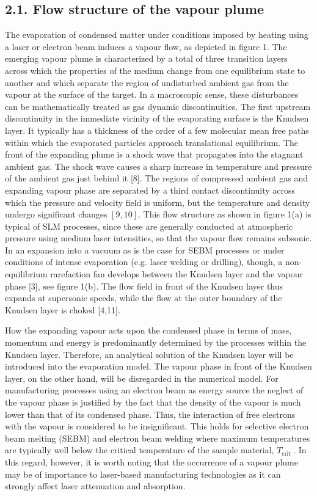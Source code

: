 \documentclass[10pt]{article}
\begin{document}
\subsection*{2.1. Flow structure of the vapour plume}
The evaporation of condensed matter under conditions imposed by heating using a laser or electron beam induces a vapour flow, as depicted in figure 1. The emerging vapour plume is characterized by a total of three transition layers across which the properties of the medium change from one equilibrium state to another and which separate the region of undisturbed ambient gas from the vapour at the surface of the target. In a macroscopic sense, these disturbances can be mathematically treated as gas dynamic discontinuities. The first upstream discontinuity in the immediate vicinity of the evaporating surface is the Knudsen layer. It typically has a thickness of the order of a few molecular mean free paths within which the evaporated particles approach translational equilibrium. The front of the expanding plume is a shock wave that propagates into the stagnant ambient gas. The shock wave causes a sharp increase in temperature and pressure of the ambient gas just behind it [8]. The regions of compressed ambient gas and expanding vapour phase are separated by a third contact discontinuity across which the pressure and velocity field is uniform, but the temperature and density undergo significant changes $[9,10]$. This flow structure as shown in figure 1(a) is typical of SLM processes, since these are generally conducted at atmospheric pressure using medium laser intensities, so that the vapour flow remains subsonic. In an expansion into a vacuum as is the case for SEBM processes or under conditions of intense evaporation (e.g. laser welding or drilling), though, a non-equilibrium rarefaction fan develops between the Knudsen layer and the vapour phase [3], see figure 1(b). The flow field in front of the Knudsen layer thus expands at supersonic speeds, while the flow at the outer boundary of the Knudsen layer is choked [4,11].

How the expanding vapour acts upon the condensed phase in terms of mass, momentum and energy is predominantly determined by the processes within the Knudsen layer. Therefore, an analytical solution of the Knudsen layer will be introduced into the evaporation model. The vapour phase in front of the Knudsen layer, on the other hand, will be disregarded in the numerical model. For manufacturing processes using an electron beam as energy source the neglect of the vapour phase is justified by the fact that the density of the vapour is much lower than that of its condensed phase. Thus, the interaction of free electrons with the vapour is considered to be insignificant. This holds for selective electron beam melting (SEBM) and electron beam welding where maximum temperatures are typically well below the critical temperature of the sample material, $T_{\text {crit }}$. In this regard, however, it is worth noting that the occurrence of a vapour plume may be of importance to laser-based manufacturing technologies as it can strongly affect laser attenuation and absorption.
\end{document}

